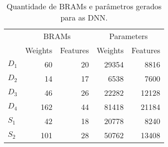 \begin{table}[ht!]
\centering
\caption{Quantidade de BRAMs e parâmetros gerados para as DNN.}
\label{tab:5-dnn-benchmark}
\begin{tabular}{lrrrr}
\toprule
 & \multicolumn{2}{c}{BRAMs} & \multicolumn{2}{c}{Parameters} \\
\cmidrule(r){2-3} \cmidrule(l){4-5}
 & Weights & Features & Weights & Features \\
\midrule
$D_1$ & 60 & 20 & 29354 & 8816 \\
$D_2$ & 14 & 17 & 6538 & 7600 \\
$D_3$ & 46 & 26 & 22282 & 12128 \\
$D_4$ & 162 & 44 & 81418 & 21184 \\
$S_1$ & 42 & 18 & 20778 & 8240 \\
$S_2$ & 101 & 28 & 50762 & 13408 \\
\bottomrule
\end{tabular}
\end{table}
